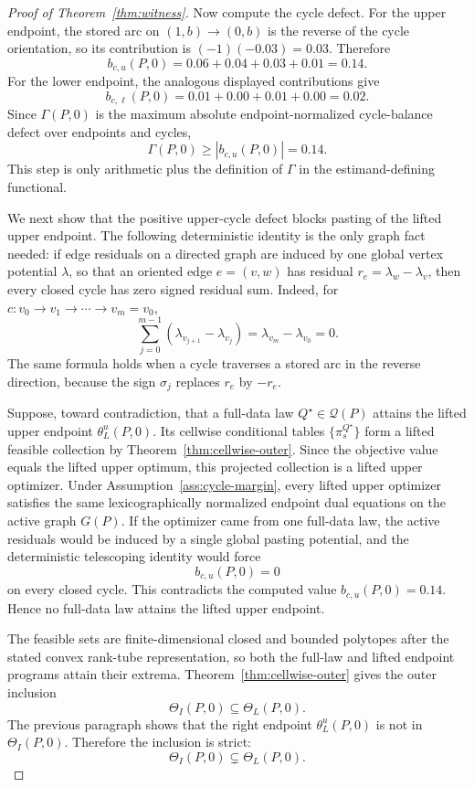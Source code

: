 \documentclass[11pt]{article}
\theoremstyle{definition}
\theoremstyle{plain}
\theoremstyle{remark}
\begin{document}
\begin{proof}[Proof of Theorem~\ref{thm:witness}]
Now compute the cycle defect.  For the upper endpoint, the stored arc on \((1,b)\to(0,b)\) is the reverse of the cycle orientation, so its contribution is \((-1)(-0.03)=0.03\).  Therefore
\[
b_{c,u}(P,0)
=0.06+0.04+0.03+0.01
=0.14.
\]
For the lower endpoint, the analogous displayed contributions give
\[
b_{c,\ell}(P,0)=0.01+0.00+0.01+0.00=0.02.
\]
Since \(\Gamma(P,0)\) is the maximum absolute endpoint-normalized cycle-balance defect over endpoints and cycles,
\[
\Gamma(P,0)\ge |b_{c,u}(P,0)|=0.14.
\]
This step is only arithmetic plus the definition of \(\Gamma\) in the estimand-defining functional.

We next show that the positive upper-cycle defect blocks pasting of the lifted upper endpoint.  The following deterministic identity is the only graph fact needed: if edge residuals on a directed graph are induced by one global vertex potential \(\lambda\), so that an oriented edge \(e=(v,w)\) has residual \(r_e=\lambda_w-\lambda_v\), then every closed cycle has zero signed residual sum.  Indeed, for \(c:v_0\to v_1\to\cdots\to v_m=v_0\),
\[
\sum_{j=0}^{m-1}(\lambda_{v_{j+1}}-\lambda_{v_j})=\lambda_{v_m}-\lambda_{v_0}=0.
\]
The same formula holds when a cycle traverses a stored arc in the reverse direction, because the sign \(\sigma_j\) replaces \(r_e\) by \(-r_e\).

Suppose, toward contradiction, that a full-data law \(Q^\star\in\mathcal Q(P)\) attains the lifted upper endpoint \(\theta_L^u(P,0)\).  Its cellwise conditional tables \(\{\pi_s^{Q^\star}\}\) form a lifted feasible collection by Theorem~\ref{thm:cellwise-outer}.  Since the objective value equals the lifted upper optimum, this projected collection is a lifted upper optimizer.  Under Assumption~\ref{ass:cycle-margin}, every lifted upper optimizer satisfies the same lexicographically normalized endpoint dual equations on the active graph \(G(P)\).  If the optimizer came from one full-data law, the active residuals would be induced by a single global pasting potential, and the deterministic telescoping identity would force
\[
b_{c,u}(P,0)=0
\]
on every closed cycle.  This contradicts the computed value \(b_{c,u}(P,0)=0.14\).  Hence no full-data law attains the lifted upper endpoint.

The feasible sets are finite-dimensional closed and bounded polytopes after the stated convex rank-tube representation, so both the full-law and lifted endpoint programs attain their extrema.  Theorem~\ref{thm:cellwise-outer} gives the outer inclusion
\[
\Theta_I(P,0)\subseteq\Theta_L(P,0).
\]
The previous paragraph shows that the right endpoint \(\theta_L^u(P,0)\) is not in \(\Theta_I(P,0)\).  Therefore the inclusion is strict:
\[
\Theta_I(P,0)\subsetneq\Theta_L(P,0).
\]


\end{proof}
\end{document}
